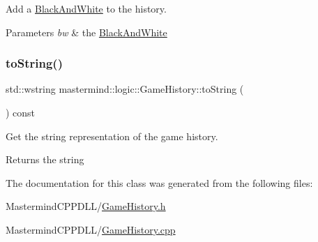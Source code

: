 Add a \hyperlink{classmastermind_1_1logic_1_1_black_and_white}{Black\+And\+White} to the history. 


\begin{DoxyParams}{Parameters}
{\em bw} & the \hyperlink{classmastermind_1_1logic_1_1_black_and_white}{Black\+And\+White} \\
\hline
\end{DoxyParams}
\hypertarget{classmastermind_1_1logic_1_1_game_history_ae3795a9ab89a850bc3b1f36d3ba76756}{}\label{classmastermind_1_1logic_1_1_game_history_ae3795a9ab89a850bc3b1f36d3ba76756} 
\subsubsection{\texorpdfstring{to\+String()}{toString()}}
{\footnotesize\ttfamily std\+::wstring mastermind\+::logic\+::\+Game\+History\+::to\+String (\begin{DoxyParamCaption}{ }\end{DoxyParamCaption}) const}



Get the string representation of the game history. 

\begin{DoxyReturn}{Returns}
the string 
\end{DoxyReturn}


The documentation for this class was generated from the following files\+:\begin{DoxyCompactItemize}
\item 
Mastermind\+C\+P\+P\+D\+L\+L/\hyperlink{_game_history_8h}{Game\+History.\+h}\item 
Mastermind\+C\+P\+P\+D\+L\+L/\hyperlink{_game_history_8cpp}{Game\+History.\+cpp}\end{DoxyCompactItemize}
